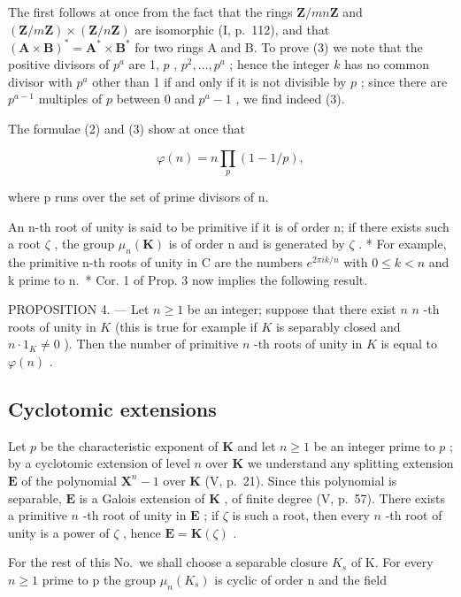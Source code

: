 The first follows at once from the fact that the rings \(\mathbf{Z} / mn\mathbf{Z}\) and \((\mathbf{Z} / m\mathbf{Z}) \times (\mathbf{Z} / n\mathbf{Z})\) are isomorphic (I, p.~112), and that \((\mathbf{A} \times \mathbf{B})^{*} = \mathbf{A}^{*} \times \mathbf{B}^{*}\) for two rings A and B. To prove (3) we note that the positive divisors of \(p^{a}\) are 1, \(p\) , \(p^{2}, \ldots, p^{a}\) ; hence the integer \(k\) has no common divisor with \(p^{a}\) other than 1 if and only if it is not divisible by \(p\) ; since there are \(p^{a-1}\) multiples of \(p\) between 0 and \(p^{a}-1\) , we find indeed (3).

The formulae (2) and (3) show at once that

\[
\varphi (n) = n \prod_ {p} (1 - 1 / p),\tag{4}
\]

where p runs over the set of prime divisors of n.

An n-th root of unity is said to be primitive if it is of order n; if there exists such a root \(\zeta\) , the group \(\mu_{n}(\mathbf{K})\) is of order n and is generated by \(\zeta\) . * For example, the primitive n-th roots of unity in C are the numbers \(e^{2\pi ik/n}\) with \(0 \leqslant k < n\) and k prime to n.~* Cor. 1 of Prop. 3 now implies the following result.

PROPOSITION 4. --- Let \(n \geqslant 1\) be an integer; suppose that there exist \(n\) \(n\) -th roots of unity in \(K\) (this is true for example if \(K\) is separably closed and \(n \cdot 1_{K} \neq 0\) ). Then the number of primitive \(n\) -th roots of unity in \(K\) is equal to \(\varphi(n)\) .

\subsection{Cyclotomic extensions}

Let \(p\) be the characteristic exponent of \(\mathbf{K}\) and let \(n \geqslant 1\) be an integer prime to \(p\) ; by a cyclotomic extension of level \(n\) over \(\mathbf{K}\) we understand any splitting extension \(\mathbf{E}\) of the polynomial \(\mathbf{X}^n - 1\) over \(\mathbf{K}\) (V, p.~21). Since this polynomial is separable, \(\mathbf{E}\) is a Galois extension of \(\mathbf{K}\) , of finite degree (V, p.~57). There exists a primitive \(n\) -th root of unity in \(\mathbf{E}\) ; if \(\zeta\) is such a root, then every \(n\) -th root of unity is a power of \(\zeta\) , hence \(\mathbf{E} = \mathbf{K}(\zeta)\) .

For the rest of this No.~we shall choose a separable closure \(K_{s}\) of K. For every \(n \geqslant 1\) prime to p the group \(\mu_{n}(K_{s})\) is cyclic of order n and the field

